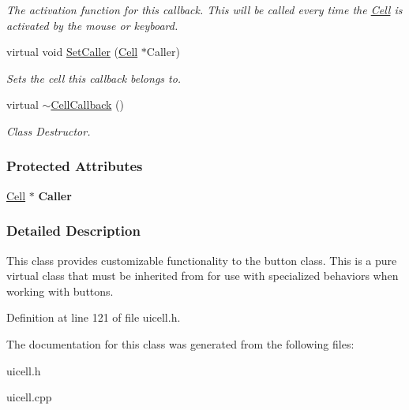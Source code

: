 \begin{DoxyCompactItemize}
\begin{DoxyCompactList}\small\item\em The activation function for this callback. This will be called every time the \hyperlink{classMezzanine_1_1UI_1_1Cell}{Cell} is activated by the mouse or keyboard. \item\end{DoxyCompactList}\item 
\hypertarget{classMezzanine_1_1UI_1_1CellCallback_a1a04d449e712481da4b91716feab98dc}{
virtual void \hyperlink{classMezzanine_1_1UI_1_1CellCallback_a1a04d449e712481da4b91716feab98dc}{SetCaller} (\hyperlink{classMezzanine_1_1UI_1_1Cell}{Cell} $\ast$Caller)}
\label{classMezzanine_1_1UI_1_1CellCallback_a1a04d449e712481da4b91716feab98dc}

\begin{DoxyCompactList}\small\item\em Sets the cell this callback belongs to. \item\end{DoxyCompactList}\item 
\hypertarget{classMezzanine_1_1UI_1_1CellCallback_a3941fd4cf14ef8ed6b18474801a01863}{
virtual \hyperlink{classMezzanine_1_1UI_1_1CellCallback_a3941fd4cf14ef8ed6b18474801a01863}{$\sim$CellCallback} ()}
\label{classMezzanine_1_1UI_1_1CellCallback_a3941fd4cf14ef8ed6b18474801a01863}

\begin{DoxyCompactList}\small\item\em Class Destructor. \item\end{DoxyCompactList}\end{DoxyCompactItemize}
\subsubsection*{Protected Attributes}
\begin{DoxyCompactItemize}
\item 
\hypertarget{classMezzanine_1_1UI_1_1CellCallback_ab1a0b41e337fe82ef41b237b9c591d7f}{
\hyperlink{classMezzanine_1_1UI_1_1Cell}{Cell} $\ast$ {\bfseries Caller}}
\label{classMezzanine_1_1UI_1_1CellCallback_ab1a0b41e337fe82ef41b237b9c591d7f}

\end{DoxyCompactItemize}


\subsubsection{Detailed Description}
This class provides customizable functionality to the button class. This is a pure virtual class that must be inherited from for use with specialized behaviors when working with buttons. 

Definition at line 121 of file uicell.h.



The documentation for this class was generated from the following files:\begin{DoxyCompactItemize}
\item 
uicell.h\item 
uicell.cpp\end{DoxyCompactItemize}
